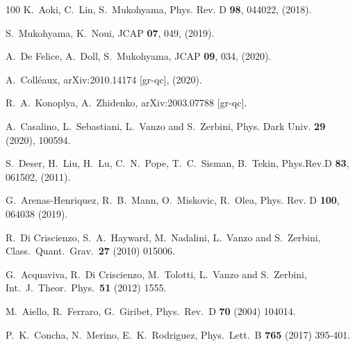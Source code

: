 \documentclass[aps,prd,preprint,nofootinbib]{revtex4-1}
\begin{document}
\begin{thebibliography}{100}
 K.~Aoki, C.~Lin, S.~Mukohyama,
	Phys. Rev. D {\bf 98}, 044022, (2018).

 S.~Mukohyama, K.~Noui,
	 JCAP {\bf 07}, 049, (2019).

 A.~De Felice, A.~Doll, S.~Mukohyama, 
	JCAP {\bf 09}, 034, (2020).

 A.~Coll\'eaux,
 arXiv:2010.14174 [gr-qc], (2020).

 R.~A.~Konoplya, A.~Zhidenko, 
  arXiv:2003.07788 [gr-qc].

 A.~Casalino, L.~Sebastiani, L.~Vanzo and S.~Zerbini,
Phys. Dark Univ. \textbf{29} (2020), 100594.

 S.~Deser, H.~Liu, H.~Lu, C.~N.~Pope, T.~C.~Sisman, B.~Tekin,
   Phys.Rev.D {\bf 83}, 061502, (2011).

 G.~Arenas-Henriquez, R.~B.~Mann, O.~Miskovic, R.~Olea,
  Phys. Rev. D {\bf 100}, 064038 (2019).

 R.~Di Criscienzo, S.~A.~Hayward, M.~Nadalini, L.~Vanzo and S.~Zerbini,
  Class.\ Quant.\ Grav.\  {\bf 27} (2010) 015006.

 G.~Acquaviva, R.~Di Criscienzo, M.~Tolotti, L.~Vanzo and S.~Zerbini,
  Int.\ J.\ Theor.\ Phys.\  {\bf 51} (2012) 1555.

 M.~Aiello, R.~Ferraro, G.~Giribet,
Phys.\ Rev.\ D {\bf 70} (2004) 104014.

 P.~K.~Concha, N.~Merino, E.~K.~Rodriguez,
Phys.\ Lett.\ B {\bf 765} (2017) 395-401.


\end{thebibliography}
\end{document}
